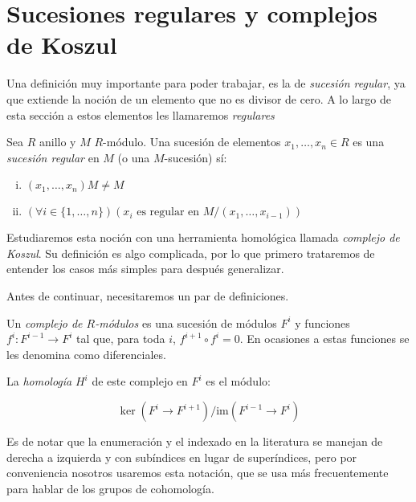 \section{Sucesiones regulares y complejos de Koszul}

Una definición muy importante para poder trabajar, es la de \emph{sucesión regular}, ya que extiende la noción de un elemento que no es divisor de cero. A lo largo de esta sección a estos elementos les llamaremos \emph{regulares}

\begin{definition}

Sea $R$ anillo y $M$ $R$-módulo. Una sucesión de elementos $x_1,\dots,x_n \in R$ es una \emph{sucesión regular} en $M$ (o una $M$-sucesión) sí:

\begin{enumerate}[i)]
\item $(x_1,\dots,x_n)M \neq M$
\item $(\forall i \in \{1,\dots, n\})(x_i \textrm{ es regular en } M/(x_1,\dots, x_{i-1}))$
\end{enumerate}

\end{definition}

Estudiaremos esta noción con una herramienta homológica llamada \emph{complejo de Koszul}. Su definición es algo complicada, por lo que primero trataremos de entender los casos más simples para después generalizar.

Antes de continuar, necesitaremos un par de definiciones.

\begin{definition}

Un \emph{complejo de $R$-módulos} es una sucesión de módulos $F^i$ y funciones $f^i: F^{i-1}\rightarrow F^i$ tal que, para toda $i$, $f^{i+1} \circ f^i = 0$. En ocasiones a estas funciones se les denomina como diferenciales.

La \emph{homología} $H^i$ de este complejo en $F^i$ es el módulo:

$$ \ker(F^i\rightarrow F^{i+1})/\textrm{im}(F^{i-1}\rightarrow F^{i})$$

\end{definition}

Es de notar que la enumeración y el indexado en la literatura se manejan de derecha a izquierda y con subíndices en lugar de superíndices, pero por conveniencia nosotros usaremos esta notación, que se usa más frecuentemente para hablar de los grupos de cohomología.

